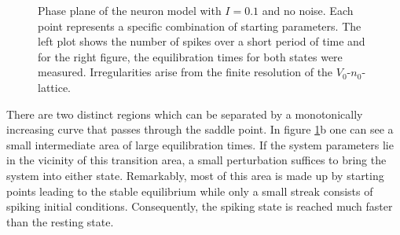 \documentclass[12pt,a4paper]{article}
\begin{document}
\begin{figure}[H]
	\hspace*{-0.5cm}
	
	\caption{Phase plane of the neuron model with $I=0.1$ and no noise. Each point represents a specific combination of starting parameters. The left plot shows the number of spikes over a short period of time and for the right figure, the equilibration times for both states were measured. Irregularities arise from the finite resolution of the $V_0$-$n_0$-lattice.}
	\label{twodom}
\end{figure}		
There are two distinct regions which can be separated by a monotonically increasing curve that passes through the saddle point. In figure \ref{twodom}b one can see a small intermediate area of large equilibration times. If the system parameters lie in the vicinity of this transition area, a small perturbation suffices to bring the system into either state. Remarkably, most of this area is made up by starting points leading to the stable equilibrium while only a small streak consists of spiking initial conditions. Consequently, the spiking state is reached much faster than the resting state.
\end{document}
